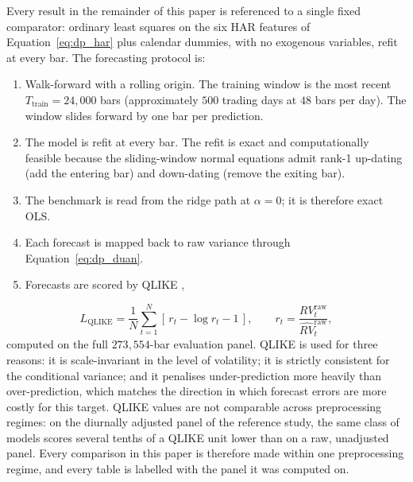 Every result in the remainder of this paper is referenced to a single
fixed comparator: ordinary least squares on the six HAR features of
Equation~\eqref{eq:dp_har} plus calendar dummies, with no exogenous
variables, refit at every bar. The forecasting protocol is:
\begin{enumerate}
    \item Walk-forward with a rolling origin. The training window is the
      most recent $T_{\mathrm{train}} = 24{,}000$ bars (approximately
      $500$ trading days at $48$ bars per day). The window slides forward
      by one bar per prediction.
    \item The model is refit at every bar. The refit is exact and
      computationally feasible because the sliding-window normal
      equations admit rank-1 up-dating (add the entering bar) and
      down-dating (remove the exiting bar).
    \item The benchmark is read from the ridge path at $\alpha = 0$; it is
      therefore exact OLS.
    \item Each forecast is mapped back to raw variance through
      Equation~\eqref{eq:dp_duan}.
    \item Forecasts are scored by QLIKE \citep{Patton2011},
\end{enumerate}
\begin{equation}
    L_{\mathrm{QLIKE}}
    = \frac{1}{N}\sum_{t=1}^{N}\left[\, r_t - \log r_t - 1 \,\right],
    \qquad
    r_t = \frac{RV^{\mathrm{raw}}_t}{\widehat{RV}^{\mathrm{raw}}_t},
    \label{eq:dp_qlike}
\end{equation}
computed on the full $273{,}554$-bar evaluation panel. QLIKE is used for
three reasons: it is scale-invariant in the level of volatility; it is
strictly consistent for the conditional variance; and it penalises
under-prediction more heavily than over-prediction, which matches the
direction in which forecast errors are more costly for this target. QLIKE
values are not comparable across preprocessing regimes: on the diurnally
adjusted panel of the reference study, the same class of models scores
several tenths of a QLIKE unit lower than on a raw, unadjusted panel.
Every comparison in this paper is therefore made within one preprocessing
regime, and every table is labelled with the panel it was computed on.

